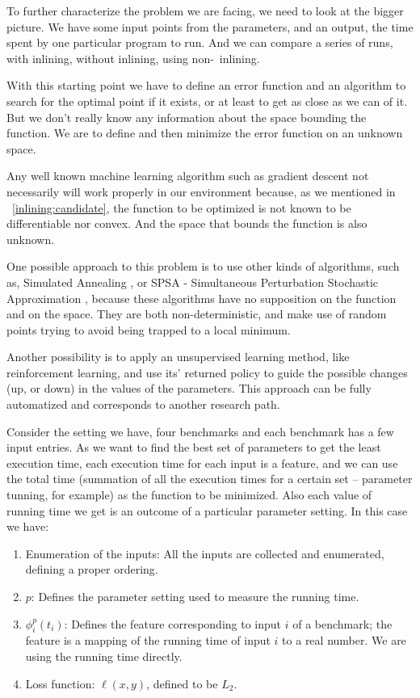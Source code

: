 

To further characterize the problem we are facing, we need to look at
the bigger picture. We have some input points from the parameters, and
an output, the time spent by one particular program to run. And we can
compare a series of runs, with inlining, without inlining, using non-\FDO\
inlining.

With this starting point we have to define an error function and an algorithm
to search for the optimal point if it exists, or at least to get as close as
we can of it. But we don't really know any information about the space bounding
the function. We are to define and then minimize the error function on an
unknown space.

Any well known machine learning algorithm such as gradient descent
not necessarily will work properly in our environment because, as
we mentioned in ~\ref{inlining:candidate}, the function to be optimized
is not known to be differentiable nor convex. And the space that bounds
the function is also unknown.

One possible approach to this problem is to use other kinds of algorithms,
such as, Simulated Annealing \cite{Zhong2009}, or SPSA - Simultaneous Perturbation Stochastic
Approximation \cite{Spall1999,Spall2012}, because these algorithms have no
supposition on the function and on the space. They are both non-deterministic,
and make use of random points trying to avoid being trapped to a local minimum.

Another possibility is to apply an unsupervised learning method, like reinforcement
learning, and use its' returned policy to guide the possible changes (up, or down)
in the values of the parameters. This approach can be fully automatized and corresponds
to another research path.

Consider the setting we have, four benchmarks and each benchmark has a few input entries. As we want to find the best set of parameters to get the least execution time, each execution time for each input is a feature, and we can use the total time (summation of all the execution times for a certain set -- parameter tunning, for example) as the function to be minimized. Also each value of running time we get is an outcome of a particular parameter setting. In this case we have:
\begin{enumerate}
 \item Enumeration of the inputs: All the inputs are collected and enumerated, defining a proper ordering.
 \item $p$: Defines the parameter setting used to measure the running time. 
 \item $\phi_i^p (t_i)$: Defines the feature corresponding to input $i$ of a benchmark; the feature is a mapping of the running time of input $i$ to a real number. We are using the running time directly.
 \item Loss function: $\ell(x, y)$, defined to be $L_2$.
\end{enumerate}

